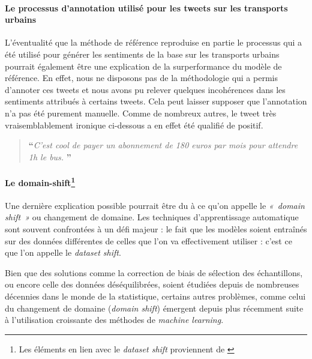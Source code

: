 \documentclass[11pt,french,french]{article}
\let\rmarkdownfootnote\footnote%
\def\footnote{\protect\rmarkdownfootnote}
\begin{document}
\hypertarget{le-processus-dannotation-utilisuxe9-pour-les-tweets-sur-les-transports-urbains}{%
\paragraph{Le processus d'annotation utilisé pour les tweets sur les transports urbains}\label{le-processus-dannotation-utilisuxe9-pour-les-tweets-sur-les-transports-urbains}}

L'éventualité que la méthode de référence reproduise en partie le processus qui a été utilisé pour générer les sentiments de la base sur les transports urbains pourrait également être une explication de la surperformance du modèle de référence.
En effet, nous ne disposons pas de la méthodologie qui a permis d'annoter ces tweets et nous avons pu relever quelques incohérences dans les sentiments attribués à certains tweets. Cela peut laisser supposer que l'annotation n'a pas été purement manuelle.
Comme de nombreux autres, le tweet très vraisemblablement ironique ci-dessous a en effet été qualifié de positif.

\begin{quote}
\LARGE \textbf{``}\normalsize \emph{C'est cool de payer un abonnement de 180 euros par mois pour attendre 1h le bus.} \LARGE \textbf{''}\normalsize
\end{quote}

\hypertarget{le-domain-shift}{%
\paragraph{\texorpdfstring{Le domain-shift\footnote{Les éléments en lien avec le \emph{dataset shift} proviennent de \cite{Candela}}}{Le domain-shift}}\label{le-domain-shift}}

Une dernière explication possible pourrait être du à ce qu'on appelle le \emph{« domain shift »} ou changement de domaine. Les techniques d'apprentissage automatique sont souvent confrontées à un défi majeur : le fait que les modèles soient entraînés sur des données différentes de celles que l'on va effectivement utiliser : c'est ce que l'on appelle le \emph{dataset shift}.

Bien que des solutions comme la correction de biais de sélection des échantillons, ou encore celle des données déséquilibrées, soient étudiées depuis de nombreuses décennies dans le monde de la statistique, certains autres problèmes, comme celui du changement de domaine (\emph{domain shift}) émergent depuis plus récemment suite à l'utilisation croissante des méthodes de \emph{machine learning}.
\end{document}
